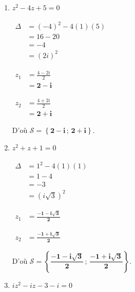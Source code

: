 \documentclass[12pt,a4paper]{article}
\begin{document}
\begin{enumerate}
\begin{enumerate}
        D'où $\mathcal{S} = \left\{\mathbf{\dfrac{3}{2} - 6i \,;\, \dfrac{3}{2} + 6i}\right\}$.

        \item $z^2 - 4z + 5 = 0$
        
        $
        \begin{aligned}
            \Delta &= (-4)^2 - 4(1)(5)\\
            &= 16 - 20\\
            &= -4\\
            &= (2i)^2
        \end{aligned}
        $
        
        $
        \begin{aligned}
            z_1 &= \frac{4 - 2i}{2}\\
            &= \mathbf{2 - i}
        \end{aligned}
        $
        
        $
        \begin{aligned}
            z_2 &= \frac{4 + 2i}{2}\\
            &= \mathbf{2 + i}
        \end{aligned}
        $
        
        D'où $\mathcal{S} = \left\{\mathbf{2 - i \,;\, 2 + i}\right\}$.

        \item $z^2 + z + 1 = 0$
        
        $
        \begin{aligned}
            \Delta &= 1^2 - 4(1)(1)\\
            &= 1 - 4\\
            &= -3\\
            &= (i\sqrt{3})^2
        \end{aligned}
        $
        
        $
        \begin{aligned}
            z_1 &= \mathbf{\frac{-1 - i\sqrt{3}}{2}}
        \end{aligned}
        $
        
        $
        \begin{aligned}
            z_2 &= \mathbf{\frac{-1 + i\sqrt{3}}{2}}
        \end{aligned}
        $
        
        D'où $\mathcal{S} = \left\{\mathbf{\dfrac{-1 - i\sqrt{3}}{2} \,;\, \dfrac{-1 + i\sqrt{3}}{2}}\right\}$.

        \item $iz^2 - iz - 3 - i = 0$
        

\end{enumerate}
\end{enumerate}
\end{document}
